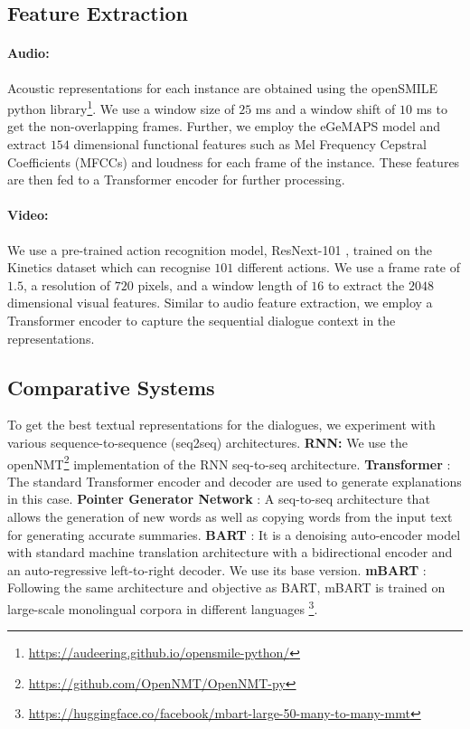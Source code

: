 \documentclass[11pt]{article}
\begin{document}
\subsection{Feature Extraction}
    \paragraph{Audio:} Acoustic representations for each instance are obtained using the openSMILE python library\footnote{\url{https://audeering.github.io/opensmile-python/}}. We use a window size of $25$ ms and a window shift of $10$ ms to get the non-overlapping frames. Further, we employ the eGeMAPS model \cite{eyben2015geneva} and extract $154$ dimensional functional features such as Mel Frequency Cepstral Coefficients (MFCCs) and loudness for each frame of the instance. These features are then fed to a Transformer encoder \cite{vaswani2017attention} for further processing.
    \paragraph{Video:} We use a pre-trained action recognition model, ResNext-101 \cite{hara2018spatiotemporal}, trained on the Kinetics dataset \cite{kay2017kinetics} which can recognise $101$ different actions. We use a frame rate of $1.5$, a resolution of $720$ pixels, and a window length of $16$  to extract the $2048$ dimensional visual features. Similar to audio feature extraction, we employ a Transformer encoder \cite{vaswani2017attention} to capture the sequential dialogue context in the representations.
    
    \subsection{Comparative Systems}
        To get the best textual representations for the dialogues, we experiment with various sequence-to-sequence (seq2seq) architectures. \textbf{RNN:} We use the openNMT\footnote{\url{https://github.com/OpenNMT/OpenNMT-py}} implementation of the RNN seq-to-seq architecture.
        \textbf{Transformer} \cite{vaswani2017attention}: The standard Transformer encoder and decoder are used to generate explanations in this case. 
\textbf{Pointer Generator Network} \cite{see2017get}: A seq-to-seq architecture that allows the generation of new words as well as copying words from the input text for generating accurate summaries. \textbf{BART} \cite{lewis2019bart}: It is a denoising auto-encoder model with standard machine translation architecture with a bidirectional encoder and an auto-regressive left-to-right decoder. We use its base version.
        \textbf{mBART} \cite{liu2020multilingual}: Following the same architecture and objective as BART, mBART is trained on large-scale monolingual corpora in different languages \footnote{\url{https://huggingface.co/facebook/mbart-large-50-many-to-many-mmt}}.
 
\end{document}
